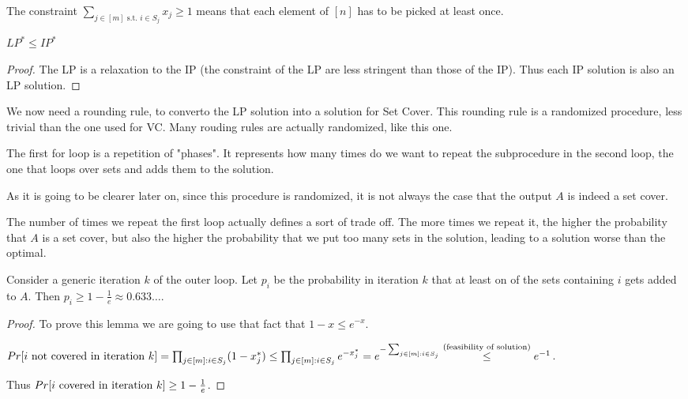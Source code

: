     The constraint $\sum_{j \in [m] \text{ s.t. } i \in S_j} x_j \geq 1$ means that each element of $[n]$ has to be picked at least once.

    \begin{observation}
        $LP^* \leq IP^*$
    \end{observation}

    \begin{proof}
        The LP is a relaxation to the IP (the constraint of the LP are less stringent than those of the IP).
        Thus each IP solution is also an LP solution.
    \end{proof}

    We now need a rounding rule, to converto the LP solution into a solution for Set Cover.
    This rounding rule is a randomized procedure, less trivial than the one used for VC. Many rouding rules are actually randomized, like this one.

    

    The first for loop is a repetition of "phases". It represents how many times do we want to repeat the subprocedure in the second loop, the one that loops over sets and adds them to the solution.

    As it is going to be clearer later on, since this procedure is randomized, it is not always the case that the output $A$ is indeed a set cover.
    
    The number of times we repeat the first loop actually defines a sort of trade off.
    The more times we repeat it, the higher the probability that $A$ is a set cover, but also the higher the probability that we put too many sets in the solution, leading to a solution worse than the optimal.
    
    \begin{lemma}
        Consider a generic iteration $k$ of the outer loop.
        Let $p_i$ be the probability in iteration $k$ that at least on of the sets containing $i$ gets added to $A$.
        Then $p_i \geq 1 - \frac{1}{e} \approx 0.633\dots$.
    \end{lemma}

    \begin{proof}
        To prove this lemma we are going to use that fact that $1 - x \leq e^{-x}$.

        $Pr[i \text{ not covered in iteration } k] = \prod_{j \in [m] \text{:} i \in S_j} (1 - x_j^*) \leq \prod_{j \in [m] \text{:} i \in S_j} e^{-x_j^*} = e^{- \sum_{j \in [m] : i \in S_j}} \overset{\text{(feasibility of solution)}}{\leq} e^{-1}$.

        Thus $Pr[i \text{ covered in iteration } k] \geq 1 - \frac{1}{e}$.
    \end{proof}

